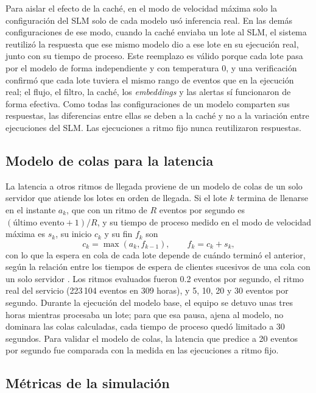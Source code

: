 Para aislar el efecto de la caché, en el modo de velocidad máxima solo la configuración del SLM solo de cada modelo usó inferencia real. En las demás configuraciones de ese modo, cuando la caché enviaba un lote al SLM, el sistema reutilizó la respuesta que ese mismo modelo dio a ese lote en su ejecución real, junto con su tiempo de proceso. Este reemplazo es válido porque cada lote pasa por el modelo de forma independiente y con temperatura 0, y una verificación confirmó que cada lote tuviera el mismo rango de eventos que en la ejecución real; el flujo, el filtro, la caché, los \textit{embeddings} y las alertas sí funcionaron de forma efectiva. Como todas las configuraciones de un modelo comparten sus respuestas, las diferencias entre ellas se deben a la caché y no a la variación entre ejecuciones del SLM. Las ejecuciones a ritmo fijo nunca reutilizaron respuestas.

\subsection{Modelo de colas para la latencia}

La latencia a otros ritmos de llegada proviene de un modelo de colas de un solo servidor que atiende los lotes en orden de llegada. Si el lote $k$ termina de llenarse en el instante $a_k$, que con un ritmo de $R$ eventos por segundo es $(\text{último evento} + 1)/R$, y su tiempo de proceso medido en el modo de velocidad máxima es $s_k$, su inicio $c_k$ y su fin $f_k$ son
\begin{equation}
c_k = \operatorname{max}(a_k, f_{k-1}), \qquad f_k = c_k + s_k,
\end{equation}
con lo que la espera en cola de cada lote depende de cuándo terminó el anterior, según la relación entre los tiempos de espera de clientes sucesivos de una cola con un solo servidor \cite{lindley1952_queues}. Los ritmos evaluados fueron 0.2 eventos por segundo, el ritmo real del servicio (223\,104 eventos en 309 horas), y 5, 10, 20 y 30 eventos por segundo. Durante la ejecución del modelo base, el equipo se detuvo unas tres horas mientras procesaba un lote; para que esa pausa, ajena al modelo, no dominara las colas calculadas, cada tiempo de proceso quedó limitado a 30 segundos. Para validar el modelo de colas, la latencia que predice a 20 eventos por segundo fue comparada con la medida en las ejecuciones a ritmo fijo.

\subsection{Métricas de la simulación}

